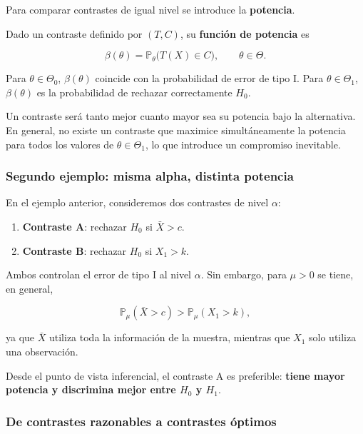 \documentclass[
]{article}
\providecommand{\tightlist}{%
  \setlength{\itemsep}{0pt}\setlength{\parskip}{0pt}}
\begin{document}
Para comparar contrastes de igual nivel se introduce la \textbf{potencia}.

Dado un contraste definido por \((T,C)\), su \textbf{función de potencia} es

\[
\beta(\theta)
=
\mathbb{P}_\theta\bigl(T(X)\in C\bigr),
\qquad \theta\in\Theta.
\]

Para \(\theta\in\Theta_0\), \(\beta(\theta)\) coincide con la probabilidad de error de tipo I. Para \(\theta\in\Theta_1\), \(\beta(\theta)\) es la probabilidad de rechazar correctamente \(H_0\).

Un contraste será tanto mejor cuanto mayor sea su potencia bajo la alternativa. En general, no existe un contraste que maximice simultáneamente la potencia para todos los valores de \(\theta\in\Theta_1\), lo que introduce un compromiso inevitable.

\subsubsection{Segundo ejemplo: misma alpha, distinta potencia}\label{segundo-ejemplo-misma-alpha-distinta-potencia}

En el ejemplo anterior, consideremos dos contrastes de nivel \(\alpha\):

\begin{enumerate}
\def\labelenumi{\arabic{enumi}.}
\tightlist
\item
  \textbf{Contraste A}: rechazar \(H_0\) si \(\bar X>c\).
\item
  \textbf{Contraste B}: rechazar \(H_0\) si \(X_1>k\).
\end{enumerate}

Ambos controlan el error de tipo I al nivel \(\alpha\). Sin embargo, para \(\mu>0\) se tiene, en general,

\[
\mathbb{P}_\mu(\bar X>c)
>
\mathbb{P}_\mu(X_1>k),
\]

ya que \(\bar X\) utiliza toda la información de la muestra, mientras que \(X_1\) solo utiliza una observación.

Desde el punto de vista inferencial, el contraste A es preferible: \textbf{tiene mayor potencia y discrimina mejor entre \(H_0\) y \(H_1\)}.

\subsubsection{De contrastes razonables a contrastes óptimos}\label{de-contrastes-razonables-a-contrastes-uxf3ptimos}
\end{document}
